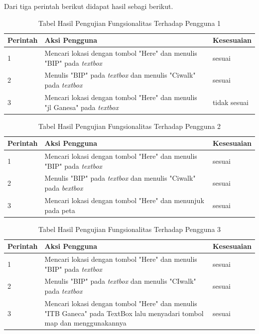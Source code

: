 Dari tiga perintah berikut didapat hasil sebagi berikut.
\begin{table}[h!]
	\centering
		\begin{tabular}{|p{}|p{9cm}|p{2cm}|}\hline
				Perintah & Aksi Pengguna & Kesesuaian \\ \hline
				1 & Mencari lokasi dengan tombol "Here" dan menulis "BIP" pada \textit{textbox} & sesuai \\ \hline
				2 & Menulis "BIP" pada \textit{textbox} dan menulis "Ciwalk" pada \textit{textbox} & sesuai \\ \hline
				3 & Mencari lokasi dengan tombol "Here" dan menulis "jl Ganesa" pada \textit{textbox} & tidak sesuai \\ \hline
		\end{tabular}
	\caption{Tabel Hasil Pengujian Fungsionalitas Terhadap Pengguna 1}
	\label{tab:TabelHasilPengujianFungsionalitasTerhadapPengguna}
\end{table}

\begin{table}[h!]
	\centering
		\begin{tabular}{|p{}|p{9cm}|p{2cm}|}\hline
				Perintah & Aksi Pengguna & Kesesuaian \\ \hline
				1 & Mencari lokasi dengan tombol "Here" dan menulis "BIP" pada \textit{textbox} & sesuai \\ \hline
				2 & Menulis "BIP" pada \textit{textbox} dan menulis "Ciwalk" pada \textit{bextbox} & sesuai \\ \hline
				3 & Mencari lokasi dengan tombol "Here" dan menunjuk pada peta & sesuai \\ \hline
		\end{tabular}
	\caption{Tabel Hasil Pengujian Fungsionalitas Terhadap Pengguna 2}
	\label{tab:TabelHasilPengujianFungsionalitasTerhadapPengguna}
\end{table}

\begin{table}[h!]
	\centering
		\begin{tabular}{|p{}|p{9cm}|p{2cm}|}\hline
				Perintah & Aksi Pengguna & Kesesuaian \\ \hline
				1 & Mencari lokasi dengan tombol "Here" dan menulis "BIP" pada \textit{textbox} & sesuai \\ \hline
				2 & Menulis "BIP" pada \textit{textbox} dan menulis "CIwalk" pada \textit{textbox} & sesuai \\ \hline
				3 & Mencari lokasi dengan tombol "Here" dan menulis "ITB Ganeca" pada TextBox lalu menyadari tombol map dan menggunakannya & sesuai \\ \hline
		\end{tabular}
	\caption{Tabel Hasil Pengujian Fungsionalitas Terhadap Pengguna 3}
	\label{tab:TabelHasilPengujianFungsionalitasTerhadapPengguna}
\end{table}

